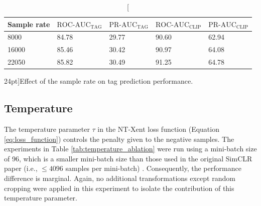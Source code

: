 \begin{table}
    \centering
        \begin{tabular}{lllll}\toprule
        Sample rate & $\text{ROC-AUC}_{\text{TAG}}$ & $\text{PR-AUC}_{\text{TAG}}$ & $\text{ROC-AUC}_{\text{CLIP}}$ & $\text{PR-AUC}_{\text{CLIP}}$ \\\midrule
        8000 & 84.78 & 29.77 & 90.60 & 62.94 \\
        16000 & 85.46 & 30.42 & 90.97 & 64.08 \\
        22050 & 85.82 & 30.49 & 91.25 & 64.78 \\                       
        \bottomrule
        \end{tabular}
    \caption[][24pt]{Effect of the sample rate on tag prediction performance.}
    \label{tab:sample_rate_ablation}
\end{table}



\subsection{Temperature}
The temperature parameter $\tau$ in the NT-Xent loss function (Equation \ref{eq:loss_function}) controls the penalty given to the negative samples. The experiments in Table \ref{tab:temperature_ablation} were run using a mini-batch size of 96, which is a smaller mini-batch size than those used in the original SimCLR paper (i.e., $\leq 4096$ samples per mini-batch) \cite{chen_simple_2020}. Consequently, the performance difference is marginal. Again, no additional transformations except random cropping were applied in this experiment to isolate the contribution of this temperature parameter.

